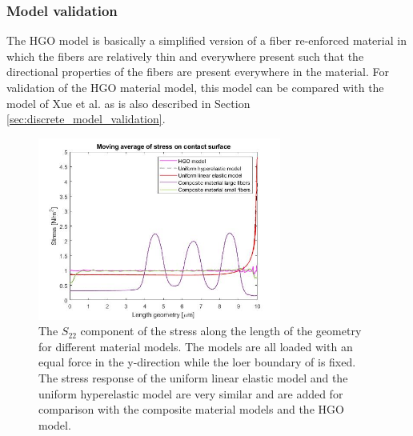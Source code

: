 \subsubsection{Model validation}\label{sec:HGO_model_validation}

The HGO model is basically a simplified version of a fiber re-enforced material in which the fibers are relatively thin and everywhere present such that the directional properties of the fibers are present everywhere in the material. For validation of the HGO material model, this model can be compared with the model of Xue et al. as is also described in Section \ref{sec:discrete_model_validation}. 


\begin{figure}[h!]
    \includegraphics[width=0.6\linewidth, height=6cm, angle=0]{images/HGO_model_validation/validatie_matlab_plot.jpg}
    \caption{The $S_{22}$ component of the stress along the length of the geometry for different material models. The models are all loaded with an equal force in the y-direction while the loer boundary of is fixed. The stress response of the uniform linear elastic model and the uniform hyperelastic model are very similar and are added for comparison with the composite material models and the HGO model.}
    \label{fig:HGO_validation}
\end{figure}

